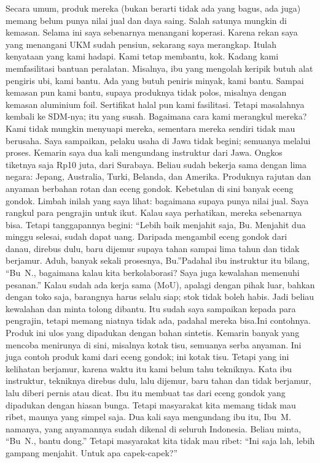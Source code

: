 {\noindent Secara umum, produk mereka (bukan berarti tidak ada yang bagus, ada juga) memang belum punya nilai jual dan daya saing. Salah satunya mungkin di kemasan. Selama ini saya sebenarnya menangani koperasi. Karena rekan saya yang menangani UKM sudah pensiun, sekarang saya merangkap. Itulah kenyataan yang kami hadapi. Kami tetap membantu, kok. Kadang kami memfasilitasi bantuan peralatan. Misalnya, ibu yang mengolah keripik butuh alat pengiris ubi, kami bantu. Ada yang butuh peniris minyak, kami bantu. Sampai kemasan pun kami bantu, supaya produknya tidak polos, misalnya dengan kemasan aluminium foil. Sertifikat halal pun kami fasilitasi. Tetapi masalahnya kembali ke SDM-nya; itu yang susah. Bagaimana cara kami merangkul mereka? Kami tidak mungkin menyuapi mereka, sementara mereka sendiri tidak mau berusaha. Saya sampaikan, pelaku usaha di Jawa tidak begini; semuanya melalui proses. Kemarin saya dua kali mengundang instruktur dari Jawa. Ongkos tiketnya saja Rp10 juta, dari Surabaya. Beliau sudah bekerja sama dengan lima negara: Jepang, Australia, Turki, Belanda, dan Amerika. Produknya rajutan dan anyaman berbahan rotan dan eceng gondok. Kebetulan di sini banyak eceng gondok. Limbah inilah yang saya lihat: bagaimana supaya punya nilai jual. Saya rangkul para pengrajin untuk ikut. Kalau saya perhatikan, mereka sebenarnya bisa. Tetapi tanggapannya begini: ``Lebih baik menjahit saja, Bu. Menjahit dua minggu selesai, sudah dapat uang. Daripada mengambil eceng gondok dari danau, direbus dulu, baru dijemur supaya tahan sampai lima tahun dan tidak berjamur. Aduh, banyak sekali prosesnya, Bu.''Padahal ibu instruktur itu bilang, ``Bu~N., bagaimana kalau kita berkolaborasi? Saya juga kewalahan memenuhi pesanan.'' Kalau sudah ada kerja sama (MoU), apalagi dengan pihak luar, bahkan dengan toko saja, barangnya harus selalu siap; stok tidak boleh habis. Jadi beliau kewalahan dan minta tolong dibantu. Itu sudah saya sampaikan kepada para pengrajin, tetapi memang niatnya tidak ada, padahal mereka bisa.Ini contohnya. Produk ini ulos yang dipadukan dengan bahan sintetis. Kemarin banyak yang mencoba menirunya di sini, misalnya kotak tisu, semuanya serba anyaman. Ini juga contoh produk kami dari eceng gondok; ini kotak tisu. Tetapi yang ini kelihatan berjamur, karena waktu itu kami belum tahu tekniknya. Kata ibu instruktur, tekniknya direbus dulu, lalu dijemur, baru tahan dan tidak berjamur, lalu diberi pernis atau dicat. Ibu itu membuat tas dari eceng gondok yang dipadukan dengan hiasan bunga. Tetapi masyarakat kita memang tidak mau ribet, maunya yang simpel saja. Dua kali saya mengundang ibu itu, Ibu~M. namanya, yang anyamannya sudah dikenal di seluruh Indonesia. Beliau minta, ``Bu~N., bantu dong.'' Tetapi masyarakat kita tidak mau ribet: ``Ini saja lah, lebih gampang menjahit. Untuk apa capek-capek?''

}
